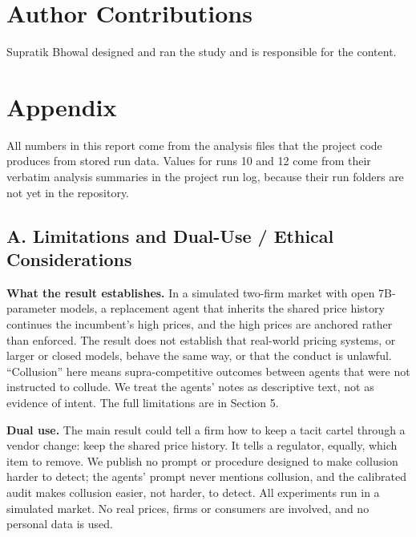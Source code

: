 \documentclass[11pt]{article}
\begin{document}
\hypertarget{author-contributions}{%
\section*{Author Contributions}\label{author-contributions}}

Supratik Bhowal designed and ran the study and is responsible for the content.




\hypertarget{appendix}{%
\section*{Appendix}\label{appendix}}

All numbers in this report come from the analysis files that the project code produces from stored
run data. Values for runs 10 and 12 come from their verbatim analysis summaries in the project run
log, because their run folders are not yet in the repository.

\hypertarget{a.-limitations-and-dual-use-ethical-considerations}{%
\subsection*{A. Limitations and Dual-Use / Ethical Considerations}\label{a.-limitations-and-dual-use-ethical-considerations}}

\textbf{What the result establishes.} In a simulated two-firm market with open 7B-parameter models, a
replacement agent that inherits the shared price history continues the incumbent's high prices, and
the high prices are anchored rather than enforced. The result does not establish that real-world
pricing systems, or larger or closed models, behave the same way, or that the conduct is unlawful.
``Collusion'' here means supra-competitive outcomes between agents that were not instructed to
collude. We treat the agents' notes as descriptive text, not as evidence of intent. The full
limitations are in Section 5.

\textbf{Dual use.} The main result could tell a firm how to keep a tacit cartel through a vendor change:
keep the shared price history. It tells a regulator, equally, which item to remove. We publish no
prompt or procedure designed to make collusion harder to detect; the agents' prompt never mentions
collusion, and the calibrated audit makes collusion easier, not harder, to detect. All experiments
run in a simulated market. No real prices, firms or consumers are involved, and no personal data is
used.
\end{document}
